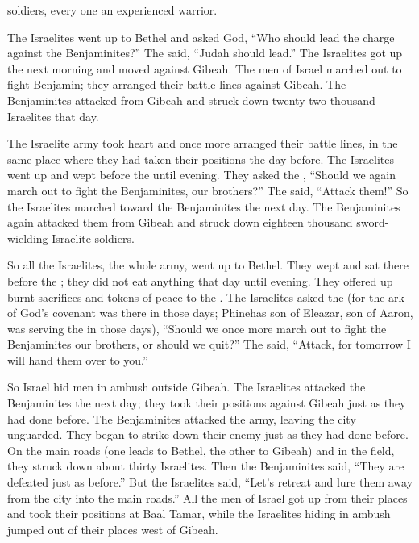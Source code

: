 {soldiers, every
one
an
experienced
warrior.
\par }{\PP {}The Israelites
went
up
to Bethel
and asked
God, “Who
should lead
the charge
against
the Benjaminites?” The
{}
said,
“Judah
should lead.”
The Israelites
got
up the next morning
and moved
against
Gibeah.
The men
of Israel
marched out
to fight
Benjamin;
they arranged
their
battle lines
against
Gibeah.
The Benjaminites
attacked
from
Gibeah
and struck down
twenty-two
thousand
Israelites
that
day.
\par }{\PP {}The Israelite
army
took heart
and once more
arranged
their battle
lines, in the same place
where
they had
taken their positions
the day
before.
The Israelites
went up
and wept
before
the {}
until
evening.
They asked
the {}, “Should we again
march out to fight
the Benjaminites,
our brothers?” The
{}
said,
“Attack
them!”
So the Israelites
marched
toward
the Benjaminites
the next
day.
The Benjaminites
again
attacked them
from
Gibeah
and struck down
eighteen
thousand
sword-wielding
Israelite
soldiers.
\par }{\PP {}So
all
the Israelites,
the whole
army,
went
up to Bethel.
They wept
and sat
there
before
the {}; they did not eat anything
that day
until
evening.
They offered
up burnt sacrifices
and tokens of peace
to the
{}.
The Israelites
asked
the {}
(for the ark
of God’s
covenant
was there
in those
days;
Phinehas
son
of Eleazar,
son
of Aaron,
was serving
the
{} in those
days), “Should we once more
march out
to fight
the Benjaminites
our brothers,
or
should we quit?” The
{}
said,
“Attack,
for
tomorrow
I will
hand them over to you.”
\par }{\PP {}So Israel
hid
men in ambush
outside
Gibeah.
The Israelites
attacked
the Benjaminites
the next day;
they took their positions
against Gibeah
just as
they had done before.
The Benjaminites
attacked
the army,
leaving
the city
unguarded.
They began
to strike
down their enemy
just as
they had done before.
On the main roads
(one
leads
to Bethel,
the other
to Gibeah) and in the field,
they struck down about thirty
Israelites.
Then the Benjaminites
said,
“They are defeated
just as before.”
But
the Israelites
said,
“Let’s retreat
and lure
them away from
the city
into
the main roads.”
All
the men
of Israel
got up
from their places
and took their positions
at Baal Tamar,
while the Israelites
hiding in ambush
jumped out
of their places
west of Gibeah.
}
